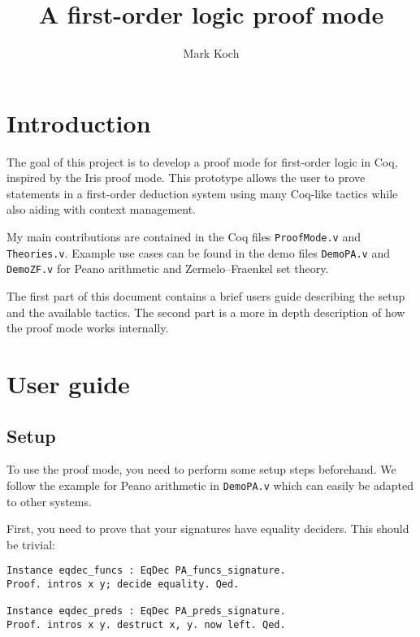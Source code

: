 \documentclass[12pt, a4paper]{article}
\title{A first-order logic proof mode}
\author{Mark Koch}
\begin{document}
\maketitle
\tableofcontents


\section{Introduction}

The goal of this project is to develop a proof mode for first-order logic in Coq, inspired by the Iris proof mode.
This prototype allows the user to prove statements in a first-order deduction system using many Coq-like tactics while also aiding with context management.

My main contributions are contained in the Coq files \texttt{ProofMode.v} and \texttt{Theories.v}. Example use cases can be found in the demo files \texttt{DemoPA.v} and \texttt{DemoZF.v} for Peano arithmetic and Zermelo–Fraenkel set theory.

The first part of this document contains a brief users guide describing the setup and the available tactics.
The second part is a more in depth description of how the proof mode works internally.


\section{User guide}

\subsection{Setup}

To use the proof mode, you need to perform some setup steps beforehand.
We follow the example for Peano arithmetic in \texttt{DemoPA.v} which can easily be adapted to other systems.

\medskip\noindent
First, you need to prove that your signatures have equality deciders. This should be trivial:

\begin{center}
\begin{minipage}{.75\textwidth}
\begin{verbatim}
Instance eqdec_funcs : EqDec PA_funcs_signature.
Proof. intros x y; decide equality. Qed.

Instance eqdec_preds : EqDec PA_preds_signature.
Proof. intros x y. destruct x, y. now left. Qed.
\end{verbatim}
\end{minipage}
\end{center}
\end{document}
